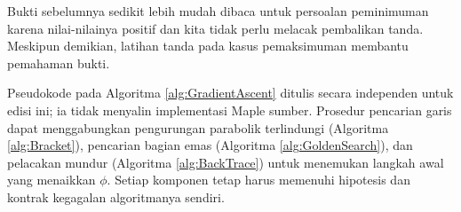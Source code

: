 \begin{cgalgorithm}[htbp]
\noindent{}
\end{cgalgorithm}
\begin{cgalgorithm}[htbp]
\caption{Implementasi acuan pendakian gradien}
\label{alg:GradientAscent}
\noindent{}
\end{cgalgorithm}

\begin{remark} Bukti sebelumnya sedikit lebih mudah dibaca untuk persoalan peminimuman karena nilai-nilainya positif dan kita tidak perlu melacak pembalikan tanda. Meskipun demikian, latihan tanda pada kasus pemaksimuman membantu pemahaman bukti.
\end{remark}

\begin{remark} Pseudokode pada Algoritma \ref{alg:GradientAscent} ditulis secara independen untuk edisi ini; ia tidak menyalin implementasi Maple sumber. Prosedur pencarian garis dapat menggabungkan pengurungan parabolik terlindungi (Algoritma \ref{alg:Bracket}), pencarian bagian emas (Algoritma \ref{alg:GoldenSearch}), dan pelacakan mundur (Algoritma \ref{alg:BackTrace}) untuk menemukan langkah awal yang menaikkan $\phi$. Setiap komponen tetap harus memenuhi hipotesis dan kontrak kegagalan algoritmanya sendiri.
\end{remark}

